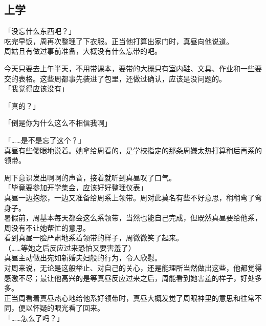 \subsection{上学}

「没忘什么东西吧？」\\

吃完早饭，周再次整理了下衣服。正当他打算出家门时，真昼向他说道。\\

周姑且有做过事前准备，大概没有什么忘带的吧。

今天只要去上午半天，不用带课本，要带的大概只有室内鞋、文具、作业和一些要交的表格。这些周都事先装进了包里，还做过确认，应该是没问题的。\\

「我觉得应该没有」

「真的？」

「倒是你为什么这么不相信我啊」

「……是不是忘了这个？」\\

真昼有些傻眼地说着。她拿给周看的，是学校指定的那条周嫌太热打算稍后再系的领带。

周下意识发出啊啊的声音，接着就听到真昼叹了口气。\\

「毕竟要参加开学集会，应该好好整理仪表」\\

真昼一边抱怨，一边又准备给周系上领带。周对此莫名有些不好意思，稍稍弯了弯身子。\\

暑假前，周基本每天都会这么系领带，当然也能自己完成，但既然真昼要给他系，周没有不让她帮忙的意思。\\

看到真昼一脸严肃地系着领带的样子，周微微笑了起来。\\

（……等她之后反应过来恐怕又要害羞了）\\

真昼主动做出宛如新婚夫妇般的行为，令人欣慰。\\

对周来说，无论是这般举止、对自己的关心，还是能理所当然做出这些，他都觉得感激不尽；最让他高兴的是等真昼反应过来之后，周能看到她害羞的样子，好处多多。\\

正当周看着真昼热心地给他系好领带时，真昼大概发觉了周眼神里的意思和往常不同，便以怀疑的眼光看了回来。\\

「……怎么了吗？」

